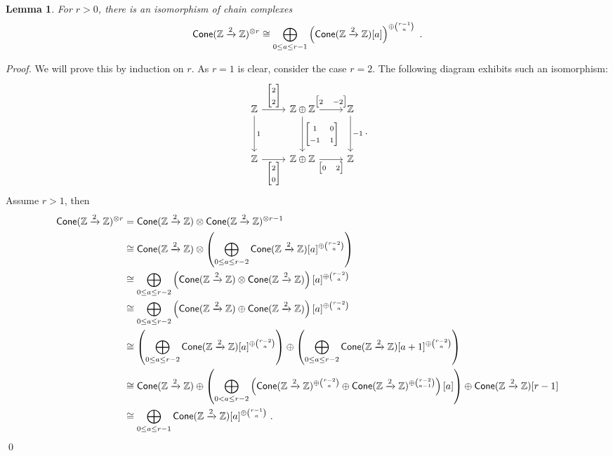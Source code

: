 \documentclass{article}
\newcommand{\msf}[1]{\mathsf{#1}}
\newcommand{\cone}{\msf{Cone}}
\newtheorem{lemma}[theorem]{Lemma}
\theoremstyle{definition}
\begin{document}
\begin{lemma}\label{directSum}
    For $r >0$, there is an isomorphism of chain complexes
    $$\cone(\ZZ\xrightarrow{2}\ZZ)^{\otimes r} \cong \bigoplus_{0 \le a \le r-1} 
        \left(\cone(\ZZ\xrightarrow{2}\ZZ)[a]\right)^{\oplus {r-1 \choose a}}~.$$
\end{lemma}
{\it Proof.}
We will prove this by induction on $r$. As $r=1$ is clear, consider the case $r=2$. The following diagram
exhibits such an isomorphism:
$$\begin{tikzcd}[ampersand replacement=\&]
    \ZZ \arrow[r,"\begin{bmatrix} 2 \\ 2\end{bmatrix}"] \arrow[dd,"1"] \& \ZZ \oplus \ZZ 
        \arrow[dd,"{\begin{bmatrix} 1 & 0 \\ -1 & 1 \end{bmatrix}}"]
        \arrow[r,"{\begin{bmatrix} 2 & -2\end{bmatrix}}"]  
        \& \ZZ \arrow[dd,"-1"] \\
    \& \& \\
    \ZZ 
        \arrow[r,"\begin{bmatrix} 2 \\ 0 \end{bmatrix}"'] 
        \& \ZZ \oplus \ZZ
        \arrow[r,"{\begin{bmatrix} 0 & 2 \end{bmatrix}}"'] 
        \& \ZZ
\end{tikzcd}.$$
Assume $r>1$, then
\begin{align*}
    \cone(\ZZ \xrightarrow{2} \ZZ)^{\otimes r} &= \cone(\ZZ \xrightarrow{2} \ZZ) \otimes 
        \cone(\ZZ \xrightarrow{2} \ZZ)^{\otimes r-1} \\
    &\cong \cone(\ZZ \xrightarrow{2} \ZZ) \otimes \left( \bigoplus_{0\le a\le r-2} 
        \cone(\ZZ \xrightarrow{2} \ZZ)[a]^{\oplus {r-2 \choose a}}\right) \\
    &\cong \bigoplus_{0\le a \le r-2} \left(\cone(\ZZ \xrightarrow{2} \ZZ) \otimes 
        \cone(\ZZ \xrightarrow{2} \ZZ)\right)[a]^{\oplus{r-2 \choose a}} \\
    &\cong \bigoplus_{0 \le a \le r-2} \left( \cone(\ZZ \xrightarrow{2} \ZZ) \oplus \cone(\ZZ \xrightarrow{2} \ZZ)\right)
        [a]^{\oplus{r-2 \choose a}} \\
    &\cong \left( \bigoplus_{0 \le a \le r-2} \cone(\ZZ \xrightarrow{2} \ZZ)[a]^{\oplus{r-2 \choose a}}\right) \oplus
        \left(\bigoplus_{0 \le a \le r-2} \cone(\ZZ \xrightarrow{2} \ZZ)[a+1]^{\oplus{r-2\choose a}}\right) \\
    &\cong \cone(\ZZ \xrightarrow{2} \ZZ) \oplus \left( \bigoplus_{0 < a \le r-2} 
        \left(\cone(\ZZ \xrightarrow{2} \ZZ)^{\oplus{r-2\choose a}} \oplus
        \cone(\ZZ \xrightarrow{2} \ZZ)^{\oplus{r-2\choose a-1}}\right)[a]\right) \oplus 
        \cone(\ZZ \xrightarrow{2} \ZZ)[r-1] \\
    &\cong \bigoplus_{0 \le a \le r-1} \cone(\ZZ \xrightarrow{2} \ZZ)[a]^{\oplus{r-1 \choose a}}~.
\end{align*}
\qed \\
\end{document}
